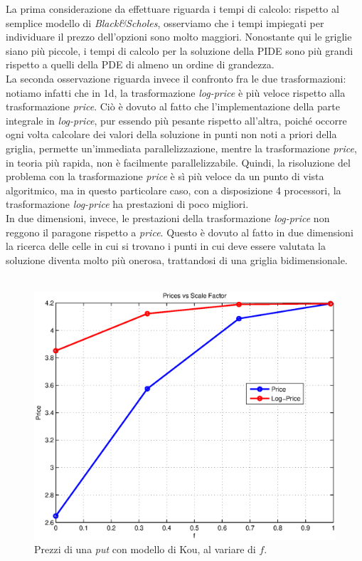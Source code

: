\documentclass[a4paper,10pt]{report}
\theoremstyle{plain}
\theoremstyle{definition}
\theoremstyle{remark}
\begin{document}
La prima considerazione da effettuare riguarda i tempi di calcolo: rispetto al semplice modello di \emph{Black\&Scholes}, osserviamo che i tempi impiegati per individuare il prezzo dell'opzioni sono molto maggiori. Nonostante qui le griglie siano pi\`u piccole, i tempi di calcolo per la soluzione della PIDE sono pi\`u grandi rispetto a quelli della PDE di almeno un ordine di grandezza.\\La seconda osservazione riguarda invece il confronto fra le due trasformazioni: notiamo infatti che in 1d, la trasformazione \emph{log-price} \`e pi\`u veloce rispetto alla trasformazione \emph{price}. Ci\`o \`e dovuto al fatto che l'implementazione della parte integrale in \emph{log-price}, pur essendo pi\`u pesante rispetto all'altra, poich\'e occorre ogni volta calcolare dei valori della soluzione in punti non noti a priori della griglia, permette un'immediata parallelizzazione, mentre la trasformazione \emph{price}, in teoria pi\`u rapida, non \`e facilmente parallelizzabile. Quindi, la risoluzione del problema con la trasformazione \emph{price} \`e s\`i pi\`u veloce da un punto di vista algoritmico, ma in questo particolare caso, con a disposizione 4 processori, la trasformazione \emph{log-price} ha prestazioni di poco migliori.\\In due dimensioni, invece, le prestazioni della trasformazione \emph{log-price} non reggono il paragone rispetto a \emph{price}. Questo è dovuto al fatto in due dimensioni la ricerca delle celle in cui si trovano i punti in cui deve essere valutata la soluzione diventa molto più onerosa, trattandosi di una griglia bidimensionale.\\\\
\begin{figure}[htp!]
\begin{center}
\includegraphics[width=12cm]{img/test2-scalefactor.eps}
\caption{Prezzi di una \emph{put} con modello di Kou, al variare di $f$.}
\label{fig:test2-scalefactor}
\end{center}
\end{figure}
\end{document}
